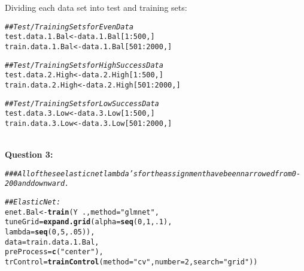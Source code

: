 \documentclass[12pt]{article}\usepackage[]{graphicx}\usepackage[]{color}
\makeatletter
\newcommand{\hlnum}[1]{\textcolor[rgb]{0.686,0.059,0.569}{#1}}%
\newcommand{\hlstr}[1]{\textcolor[rgb]{0.192,0.494,0.8}{#1}}%
\newcommand{\hlcom}[1]{\textcolor[rgb]{0.678,0.584,0.686}{\textit{#1}}}%
\newcommand{\hlopt}[1]{\textcolor[rgb]{0,0,0}{#1}}%
\newcommand{\hlstd}[1]{\textcolor[rgb]{0.345,0.345,0.345}{#1}}%
\newcommand{\hlkwb}[1]{\textcolor[rgb]{0.69,0.353,0.396}{#1}}%
\newcommand{\hlkwc}[1]{\textcolor[rgb]{0.333,0.667,0.333}{#1}}%
\newcommand{\hlkwd}[1]{\textcolor[rgb]{0.737,0.353,0.396}{\textbf{#1}}}%
\newenvironment{kframe}{%
 \def\at@end@of@kframe{}%
 \ifinner\ifhmode%
  \def\at@end@of@kframe{\end{minipage}}%
  \begin{minipage}{\columnwidth}%
 \fi\fi%
 \def\FrameCommand##1{\hskip\@totalleftmargin \hskip-\fboxsep
 \colorbox{shadecolor}{##1}\hskip-\fboxsep
     \hskip-\linewidth \hskip-\@totalleftmargin \hskip\columnwidth}%
 \MakeFramed {\advance\hsize-\width
   \@totalleftmargin\z@ \linewidth\hsize
   \@setminipage}}%
 {\par\unskip\endMakeFramed%
 \at@end@of@kframe}
\newenvironment{knitrout}{}{} %
\makeatother
\begin{document}
\begin{flushleft}
Dividing each data set into test and training sets:

\begin{knitrout}
\color{fgcolor}\begin{kframe}
\begin{alltt}
\hlcom{## Test/Training Sets for Even Data}
\hlstd{test.data.1.Bal}   \hlkwb{<-} \hlstd{data.1.Bal[}\hlnum{1}\hlopt{:}\hlnum{500}\hlstd{,]}
\hlstd{train.data.1.Bal}  \hlkwb{<-} \hlstd{data.1.Bal[}\hlnum{501}\hlopt{:}\hlnum{2000}\hlstd{,]}

\hlcom{## Test/Training Sets for High Success Data}
\hlstd{test.data.2.High}  \hlkwb{<-} \hlstd{data.2.High[}\hlnum{1}\hlopt{:}\hlnum{500}\hlstd{,]}
\hlstd{train.data.2.High} \hlkwb{<-} \hlstd{data.2.High[}\hlnum{501}\hlopt{:}\hlnum{2000}\hlstd{,]}

\hlcom{## Test/Training Sets for Low Success Data}
\hlstd{test.data.3.Low}   \hlkwb{<-} \hlstd{data.3.Low[}\hlnum{1}\hlopt{:}\hlnum{500}\hlstd{,]}
\hlstd{train.data.3.Low}  \hlkwb{<-} \hlstd{data.3.Low[}\hlnum{501}\hlopt{:}\hlnum{2000}\hlstd{,]}
\end{alltt}
\end{kframe}
\end{knitrout}


\hfill \\
\noindent \textbf{Question 3:}\\


\begin{centering}
\begin{knitrout}
\color{fgcolor}\begin{kframe}
\begin{alltt}
\hlcom{### All of these elastic net lambda's for the assignment have been narrowed from 0-200 and downward.}

\hlcom{## Elastic Net:}
\hlstd{enet.Bal} \hlkwb{<-} \hlkwd{train}\hlstd{(Y}\hlopt{~}\hlstd{.,} \hlkwc{method}\hlstd{=}\hlstr{"glmnet"}\hlstd{,}
                     \hlkwc{tuneGrid}\hlstd{=}\hlkwd{expand.grid}\hlstd{(}\hlkwc{alpha}\hlstd{=}\hlkwd{seq}\hlstd{(}\hlnum{0}\hlstd{,} \hlnum{1}\hlstd{,} \hlnum{.1}\hlstd{),}
                                          \hlkwc{lambda}\hlstd{=}\hlkwd{seq}\hlstd{(}\hlnum{0}\hlstd{,} \hlnum{5}\hlstd{,}\hlnum{.05}\hlstd{)),}
                     \hlkwc{data}\hlstd{=train.data.1.Bal,}
                     \hlkwc{preProcess}\hlstd{=}\hlkwd{c}\hlstd{(}\hlstr{"center"}\hlstd{),}
                     \hlkwc{trControl}\hlstd{=}\hlkwd{trainControl}\hlstd{(}\hlkwc{method}\hlstd{=}\hlstr{"cv"}\hlstd{,}\hlkwc{number}\hlstd{=}\hlnum{2}\hlstd{,} \hlkwc{search}\hlstd{=}\hlstr{"grid"}\hlstd{))}


\end{alltt}
\end{kframe}
\end{knitrout}
\end{centering}
\end{flushleft}
\end{document}
